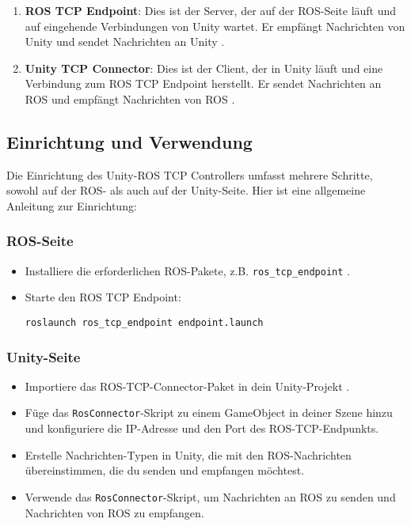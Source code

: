 \begin{enumerate}
    \item \textbf{ROS TCP Endpoint}: Dies ist der Server, der auf der ROS-Seite läuft und auf eingehende Verbindungen von Unity wartet. Er empfängt Nachrichten von Unity und sendet Nachrichten an Unity \cite{ros_tcp_endpoint}.
    \item \textbf{Unity TCP Connector}: Dies ist der Client, der in Unity läuft und eine Verbindung zum ROS TCP Endpoint herstellt. Er sendet Nachrichten an ROS und empfängt Nachrichten von ROS \cite{unity_ros_tcp_connector}.
\end{enumerate}

\subsection{Einrichtung und Verwendung}

Die Einrichtung des Unity-ROS TCP Controllers umfasst mehrere Schritte, sowohl auf der ROS- als auch auf der Unity-Seite. Hier ist eine allgemeine Anleitung zur Einrichtung:

\subsubsection{ROS-Seite}

\begin{itemize}
    \item Installiere die erforderlichen ROS-Pakete, z.B. \texttt{ros\_tcp\_endpoint} \cite{ros_tcp_endpoint}.
    \item Starte den ROS TCP Endpoint:
    \begin{verbatim}
roslaunch ros_tcp_endpoint endpoint.launch
    \end{verbatim}
\end{itemize}

\subsubsection{Unity-Seite}

\begin{itemize}
    \item Importiere das ROS-TCP-Connector-Paket in dein Unity-Projekt \cite{unity_ros_tcp_connector}.
    \item Füge das \texttt{RosConnector}-Skript zu einem GameObject in deiner Szene hinzu und konfiguriere die IP-Adresse und den Port des ROS-TCP-Endpunkts.
    \item Erstelle Nachrichten-Typen in Unity, die mit den ROS-Nachrichten übereinstimmen, die du senden und empfangen möchtest.
    \item Verwende das \texttt{RosConnector}-Skript, um Nachrichten an ROS zu senden und Nachrichten von ROS zu empfangen.
\end{itemize}

